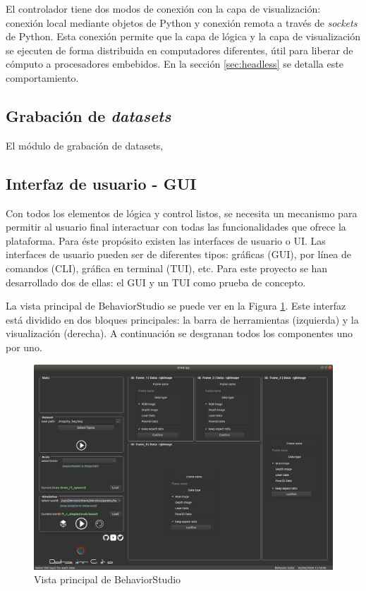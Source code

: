 El controlador tiene dos modos de conexión con la capa de visualización: conexión local mediante objetos de Python y conexión remota a través de \textit{sockets} de Python. Esta conexión permite que la capa de lógica y la capa de visualización se ejecuten de forma distribuida en computadores diferentes, útil para liberar de cómputo a procesadores embebidos. En la sección \ref{sec:headless} se detalla este comportamiento.

\subsection{Grabación de \textit{datasets}}
\label{sec:redata}

El módulo de grabación de datasets, 

\subsection{Interfaz de usuario - GUI}
\label{sec:ui}

Con todos los elementos de lógica y control listos, se necesita un mecanismo para permitir al usuario final interactuar con todas las funcionalidades que ofrece la plataforma. Para éste propósito existen las interfaces de usuario o UI. Las interfaces de usuario pueden ser de diferentes tipos: gráficas (GUI), por línea de comandos (CLI), gráfica en terminal (TUI), etc. Para este proyecto se han desarrollado dos de ellas: el GUI y un TUI como prueba de concepto.

La vista principal de BehaviorStudio se puede ver en la Figura \ref{fig:mainview}. Este interfaz está dividido en dos bloques principales: la barra de herramientas (izquierda) y la visualización (derecha). A continuación se desgranan todos los componentes uno por uno.

\begin{figure}
  \centering
  \includegraphics[width=1\linewidth]{img/main_window}
  \caption{Vista principal de BehaviorStudio}
  \label{fig:mainview}
\end{figure}

